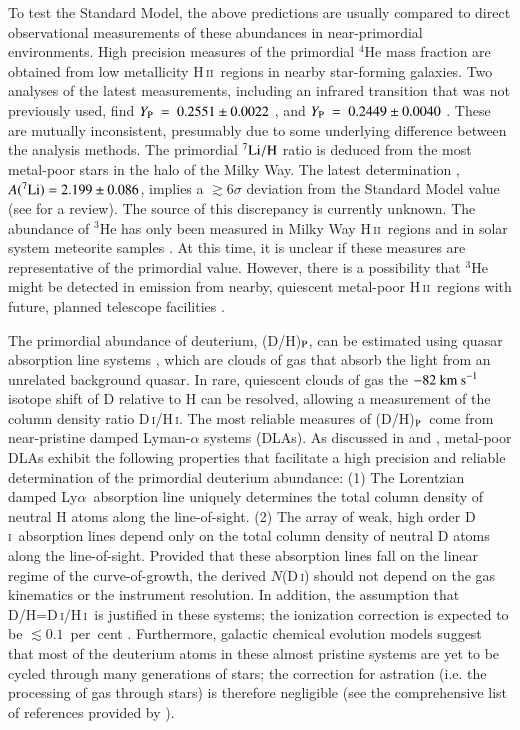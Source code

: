 \documentclass[12pt,preprint,useAMS,usenatbib]{emulateapj}
\newcommand{\dhp}{(D/H)$_{\rm P}$}
\newcommand{\DI}{\textrm{D}\,\textsc{i}}
\newcommand{\HI}{\textrm{H}\,\textsc{i}}
\newcommand{\HII}{\textrm{H}\,\textsc{ii}}
\newcommand{\Lya}{Ly$\alpha$}
\begin{document}
To test the Standard Model, the above predictions are usually
compared to direct observational measurements of these
abundances in near-primordial environments. High precision
measures of the primordial $^{4}$He mass fraction are obtained
from low metallicity \HII\ regions in nearby star-forming galaxies.
Two analyses of the latest measurements, including an infrared
transition that was not previously used, find
$Y_{\rm P}~=~0.2551\pm0.0022$ \citep{IzoThuGus14}, and
$Y_{\rm P}~=~0.2449\pm0.0040$ \citep{AveOliSki15}.
These are mutually inconsistent, presumably due to
some underlying difference between the analysis methods.
The primordial $^{7}{\rm Li/H}$ ratio is deduced from the most
metal-poor stars in the halo of the Milky Way. The latest
determination \citep{Asp06,Aok09,Mel10,Sbo10,Spi15},
$A(^{7}{\rm Li})=2.199\pm0.086$, implies a $\gtrsim6\sigma$
deviation from the Standard Model value (see \citealt{Fie11} for a review).
The source of this discrepancy is currently unknown.
The abundance of $^{3}$He has only been measured in Milky Way
\HII\ regions \citep{BanRooBal02} and in solar system meteorite
samples \citep{BusBauWie00,BusBauWie01}. At this time, it is
unclear if these measures are representative of the primordial
value. However, there is a possibility that $^{3}$He might be
detected in emission from nearby, quiescent metal-poor
\HII\ regions with future, planned telescope facilities \citep{Coo15}.

The primordial abundance of deuterium, \dhp, can be estimated using
quasar absorption line systems \citep{Ada76}, which are clouds of gas
that absorb the light from an unrelated background quasar. In rare, quiescent
clouds of gas the $-82~{\rm km~s}^{-1}$ isotope shift of D relative to H can be
resolved, allowing a measurement of the column density ratio \DI/\HI. The
most reliable measures of \dhp\ come from near-pristine damped
Lyman-$\alpha$ systems (DLAs). As discussed in \citet{PetCoo12a} and \citet{Coo14},
metal-poor DLAs exhibit the following properties that facilitate a high
precision and reliable determination of the primordial deuterium abundance:
(1) The Lorentzian damped \Lya\ absorption line uniquely determines the
total column density of neutral H atoms along the line-of-sight.
(2) The array of weak, high order \DI\ absorption lines depend only
on the total column density of neutral D atoms along the line-of-sight.
Provided that these absorption lines fall on the linear regime of
the curve-of-growth, the derived $N$(\DI) should not depend on
the gas kinematics or the instrument resolution.
In addition, the assumption that D/H=\DI/\HI\ is justified in these
systems; the ionization correction is expected to be
$\lesssim0.1$~per~cent \citep{Sav02,CooPet16}. Furthermore,
galactic chemical evolution models suggest that most of the
deuterium atoms in these almost pristine systems are yet to be
cycled through many generations of stars; the correction for
astration (i.e. the processing of gas through stars) is therefore
negligible (see the comprehensive list of references
provided by \citealt{Cyb15,Dvo16}).
\end{document}
